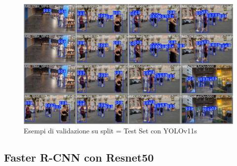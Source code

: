 \documentclass[12pt]{article}
\begin{document}
\begin{figure}[H]
    \centering
    \includegraphics[width=1.00\textwidth]{./img/val_batch1_pred-yolov11s.jpg}
    \caption{Esempi di validazione su split = Test Set con YOLOv11s}
    \label{fig:yolov11s-test-set}
\end{figure}

\subsection{Faster R-CNN con Resnet50}
\end{document}
